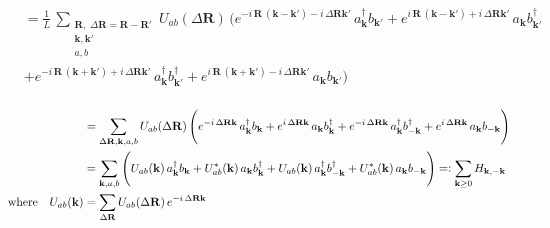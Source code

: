 \begin{align*}
     &=\frac{1}{L}\,  \sum_{\substack{\mathbf{R},\;\Delta\mathbf{R}=\mathbf{R}-\mathbf{R}' 
    \\\mathbf{k},\mathbf{k}'\\a,b}}U_{ab}(\Delta\mathbf{R})\,\Bigg(e^{-i\,\mathbf{R}\,(\mathbf{k}-\mathbf{k}')-i\,\Delta\mathbf{R}\mathbf{k}'}\, a_{\mathbf{k}}^{\dagger} b_{\mathbf{k}'}+ e^{i\,\mathbf{R}\,(\mathbf{k}-\mathbf{k}')+i\,\Delta\mathbf{R}\mathbf{k}'}\, a_{\mathbf{k}} b_{\mathbf{k}'}^{\dagger}\\&+  e^{-i\,\mathbf{R}\,(\mathbf{k}+\mathbf{k}')+i\,\Delta\mathbf{R}\mathbf{k}'}\,a_{\mathbf{k}}^{\dagger} b_{\mathbf{k}'}^{\dagger}+  e^{i\,\mathbf{R}\,(\mathbf{k}+\mathbf{k}')-i\,\Delta\mathbf{R}\mathbf{k}'}\,a_{\mathbf{k}} b_{\mathbf{k}'}\Bigg)\\\\
\end{align*}
\begin{align*}
     &=  \sum_{\substack{\Delta\mathbf{R},\mathbf{k},a,b}}U_{ab}(\Delta\mathbf{R})\,\Bigg(e^{-i\,\Delta\mathbf{R}\mathbf{k}}\, a_{\mathbf{k}}^{\dagger} b_{\mathbf{k}}+ e^{i\,\Delta\mathbf{R}\mathbf{k}} \,a_{\mathbf{k}} b_{\mathbf{k}}^{\dagger} +  e^{-i\,\Delta\mathbf{R}\mathbf{k}}\,a_{\mathbf{k}}^{\dagger} b_{-\mathbf{k}}^{\dagger}+  e^{i\,\Delta\mathbf{R}\mathbf{k}}\,a_{\mathbf{k}} b_{-\mathbf{k}}\Bigg)\\
    &=  \sum_{\substack{\mathbf{k},a,b}}\Bigg(U_{ab}(\mathbf{k})\, a_{\mathbf{k}}^{\dagger} b_{\mathbf{k}}+ U_{ab}^*(\mathbf{k})\,a_{\mathbf{k}} b_{\mathbf{k}}^{\dagger} +  U_{ab}(\mathbf{k})\,a_{\mathbf{k}}^{\dagger} b_{-\mathbf{k}}^{\dagger}+  U_{ab}^*(\mathbf{k})\,a_{\mathbf{k}} b_{-\mathbf{k}}\Bigg)=\vcentcolon \sum_{\mathbf{k}\geq0}H_{\mathbf{k},-\mathbf{k}}\\
    \text{where}\quad U_{ab}(\mathbf{k}) &= \sum_{\Delta\mathbf{R}}U_{ab}(\Delta\mathbf{R})\,e^{-i\,\Delta\mathbf{R}\mathbf{k}}
\end{align*}
